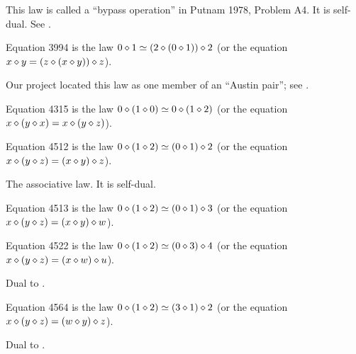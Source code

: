 This law is called a ``bypass operation'' in Putnam 1978, Problem A4. It is self-dual.  See .

\begin{definition}[Equation 3994]
  \label{eq3994}
  Equation 3994 is the law $0 \diamond 1 \simeq (2 \diamond (0 \diamond 1)) \diamond 2$ (or the equation $x \diamond y = (z \diamond (x \diamond y)) \diamond z$).
\end{definition}

Our project located this law as one member of an ``Austin pair''; see .

\begin{definition}[Equation 4315]\label{eq4315}\leanok{}  Equation 4315 is the law $0 \diamond (1 \diamond 0)  \simeq  0 \diamond (1 \diamond 2)$ (or the equation $x \diamond (y \diamond x) = x \diamond (y \diamond z)$).
\end{definition}

\begin{definition}[Equation 4512]\label{eq4512}\leanok{}  Equation 4512 is the law $0 \diamond (1 \diamond 2)  \simeq  (0 \diamond 1) \diamond 2$ (or the equation $x \diamond (y \diamond z) = (x \diamond y) \diamond z$).
\end{definition}

The associative law. It is self-dual.

\begin{definition}[Equation 4513]\label{eq4513}\leanok{}  Equation 4513 is the law $0 \diamond (1 \diamond 2)  \simeq  (0 \diamond 1) \diamond 3$ (or the equation $x \diamond (y \diamond z) = (x \diamond y) \diamond w$).
\end{definition}

\begin{definition}[Equation 4522]\label{eq4522}\leanok{}  Equation 4522 is the law $0 \diamond (1 \diamond 2)  \simeq  (0 \diamond 3) \diamond 4$ (or the equation $x \diamond (y \diamond z) = (x \diamond w) \diamond u$).
\end{definition}

Dual to .

\begin{definition}[Equation 4564]\label{eq4564}\leanok{}  Equation 4564 is the law $0 \diamond (1 \diamond 2)  \simeq  (3 \diamond 1) \diamond 2$ (or the equation $x \diamond (y \diamond z) = (w \diamond y) \diamond z$).
\end{definition}

Dual to .

